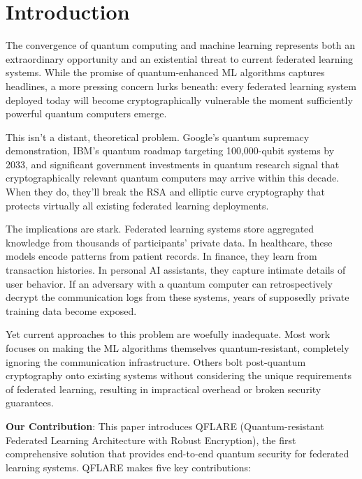 \documentclass[journal,onecolumn]{IEEEtran}
\begin{document}
\section{Introduction}

The convergence of quantum computing and machine learning represents both an extraordinary opportunity and an existential threat to current federated learning systems. While the promise of quantum-enhanced ML algorithms captures headlines, a more pressing concern lurks beneath: every federated learning system deployed today will become cryptographically vulnerable the moment sufficiently powerful quantum computers emerge.

This isn't a distant, theoretical problem. Google's quantum supremacy demonstration, IBM's quantum roadmap targeting 100,000-qubit systems by 2033, and significant government investments in quantum research signal that cryptographically relevant quantum computers may arrive within this decade. When they do, they'll break the RSA and elliptic curve cryptography that protects virtually all existing federated learning deployments.

The implications are stark. Federated learning systems store aggregated knowledge from thousands of participants' private data. In healthcare, these models encode patterns from patient records. In finance, they learn from transaction histories. In personal AI assistants, they capture intimate details of user behavior. If an adversary with a quantum computer can retrospectively decrypt the communication logs from these systems, years of supposedly private training data become exposed.

Yet current approaches to this problem are woefully inadequate. Most work focuses on making the ML algorithms themselves quantum-resistant, completely ignoring the communication infrastructure. Others bolt post-quantum cryptography onto existing systems without considering the unique requirements of federated learning, resulting in impractical overhead or broken security guarantees.

\textbf{Our Contribution}: This paper introduces QFLARE (Quantum-resistant Federated Learning Architecture with Robust Encryption), the first comprehensive solution that provides end-to-end quantum security for federated learning systems. QFLARE makes five key contributions:
\end{document}
